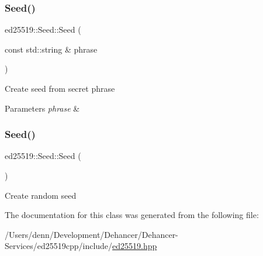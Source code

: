 \subsubsection{\texorpdfstring{Seed()}{Seed()}\hspace{0.1cm}{\footnotesize\ttfamily [1/2]}}
{\footnotesize\ttfamily ed25519\+::\+Seed\+::\+Seed (\begin{DoxyParamCaption}\item[{const std\+::string \&}]{phrase }\end{DoxyParamCaption})}

Create seed from secret phrase 
\begin{DoxyParams}{Parameters}
{\em phrase} & \\
\hline
\end{DoxyParams}
\mbox{\label{classed25519_1_1_seed_ade6584a80efeb3ad8b89929a9684b30f}} 
\subsubsection{\texorpdfstring{Seed()}{Seed()}\hspace{0.1cm}{\footnotesize\ttfamily [2/2]}}
{\footnotesize\ttfamily ed25519\+::\+Seed\+::\+Seed (\begin{DoxyParamCaption}{ }\end{DoxyParamCaption})}

Create random seed 

The documentation for this class was generated from the following file\+:\begin{DoxyCompactItemize}
\item 
/\+Users/denn/\+Development/\+Dehancer/\+Dehancer-\/\+Services/ed25519cpp/include/\mbox{\hyperlink{ed25519_8hpp}{ed25519.\+hpp}}\end{DoxyCompactItemize}
